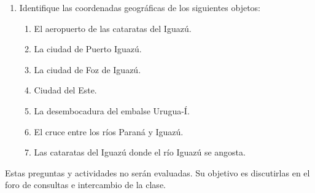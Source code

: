 \begin{enumerate}
  \item Identifique las coordenadas geográficas de los siguientes objetos:
  \begin{enumerate}
    \item El aeropuerto de las cataratas del Iguazú.
    \item La ciudad de Puerto Iguazú.
    \item La ciudad de Foz de Iguazú.
    \item Ciudad del Este.
    \item La desembocadura del embalse Urugua-Í.
    \item El cruce entre los ríos Paraná y Iguazú.
    \item Las cataratas del Iguazú donde el río Iguazú se angosta.
  \end{enumerate}
\end{enumerate}

Estas preguntas y actividades no serán evaluadas. Su objetivo es discutirlas en el foro de consultas e intercambio de la clase.
